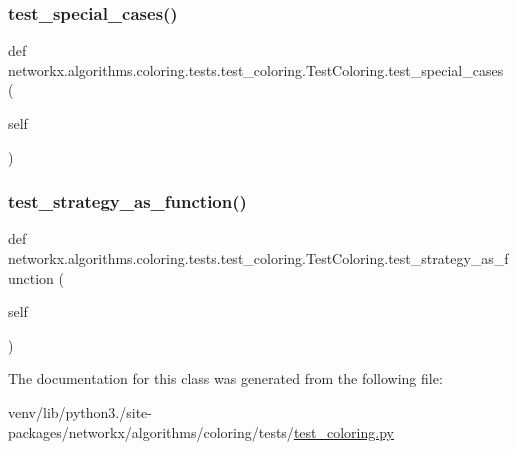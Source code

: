 \subsubsection{\texorpdfstring{test\+\_\+special\+\_\+cases()}{test\_special\_cases()}}
{\footnotesize\ttfamily def networkx.\+algorithms.\+coloring.\+tests.\+test\+\_\+coloring.\+Test\+Coloring.\+test\+\_\+special\+\_\+cases (\begin{DoxyParamCaption}\item[{}]{self }\end{DoxyParamCaption})}

\mbox{\label{classnetworkx_1_1algorithms_1_1coloring_1_1tests_1_1test__coloring_1_1TestColoring_ab22f0d26e4ddfa170433f3dc02301f9f}} 
\subsubsection{\texorpdfstring{test\+\_\+strategy\+\_\+as\+\_\+function()}{test\_strategy\_as\_function()}}
{\footnotesize\ttfamily def networkx.\+algorithms.\+coloring.\+tests.\+test\+\_\+coloring.\+Test\+Coloring.\+test\+\_\+strategy\+\_\+as\+\_\+function (\begin{DoxyParamCaption}\item[{}]{self }\end{DoxyParamCaption})}



The documentation for this class was generated from the following file\+:\begin{DoxyCompactItemize}
\item 
venv/lib/python3./site-\/packages/networkx/algorithms/coloring/tests/\hyperlink{test__coloring_8py}{test\+\_\+coloring.\+py}\end{DoxyCompactItemize}
